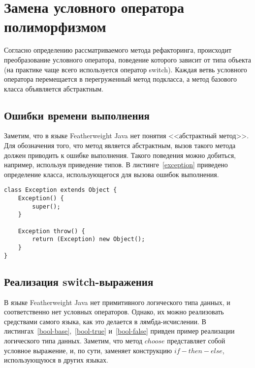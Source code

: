 \section{Замена условного оператора полиморфизмом}
Согласно определению рассматриваемого метода рефакторинга, происходит преобразование условного оператора, поведение которого зависит от типа объекта (на практике чаще всего используется оператор switch).
Каждая ветвь условного оператора перемещается в перегруженный метод подкласса, а метод базового класса объявляется абстрактным.

\subsection{Ошибки времени выполнения}
Заметим, что в языке Featherweight Java нет понятия <<абстрактный метод>>. Для обозначения того, что метод является абстрактным, вызов такого метода должен приводить к ошибке выполнения.
Такого поведения можно добиться, например, используя приведение типов. В листинге~\ref{exception} приведено определение класса, использующегося для вызова ошибок выполнения.
\begin{lstlisting}[float=htb,label=exception,caption=Определение класса Exception.]
class Exception extends Object {
    Exception() {
        super();
    }

    Exception throw() {
        return (Exception) new Object();
    }
}
\end{lstlisting}

\subsection{Реализация switch-выражения}
В языке Featherweight Java нет примитивного логического типа данных, и соответственно нет условных операторов. Однако, их можно реализовать средствами самого языка, как это делается в лямбда-исчислении.
В листингах~\ref{bool-base},~\ref{bool-true} и~\ref{bool-false} привден пример реализации логического типа данных. Заметим, что метод $choose$ представляет собой условное выражение, и, по сути, заменяет конструкцию $if-then-else$,
использующуюся в других языках.

